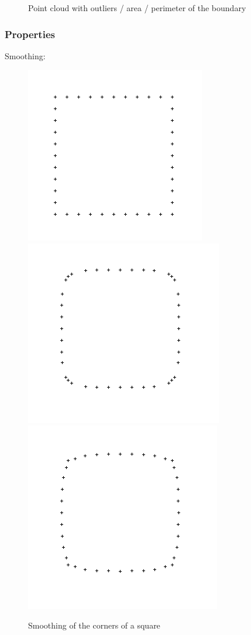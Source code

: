 \documentclass{beamer}
\begin{document}
\begin{frame}
\begin{figure}
        \caption{Point cloud with outliers / area / perimeter of the boundary}
    \end{figure}
\end{frame}

\begin{frame}
    \frametitle{Properties}

    Smoothing:
    \begin{figure}
        \centering
        \includegraphics[scale=0.2]{img/square}
        \includegraphics[scale=0.2]{img/square-smooth-area}
        \includegraphics[scale=0.2]{img/square-smooth-perimeter}
        \caption{Smoothing of the corners of a square}
    \end{figure}


\end{frame}
\end{document}
